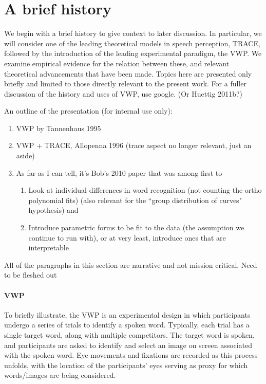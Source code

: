 \documentclass{article}
\begin{document}


\section{A brief history}
We begin with a brief history to give context to later discussion. In particular, we will consider one of the leading theoretical models in speech perception, TRACE, followed by the introduction of the leading experimental paradigm, the VWP. We examine empirical evidence for the relation between these, and relevant theoretical advancements that have been made. Topics here are presented only briefly and limited to those directly relevant to the present work. For a fuller discussion of the history and uses of VWP, use google. (Or Huettig 2011b?)

An outline of the presentation (for internal use only):

\begin{singlespace}
\begin{enumerate}
\vspace{-2mm}
\item VWP by Tannenhaus 1995
\item VWP + TRACE, Allopenna 1996 (trace aspect no longer relevant, just an aside)
\item As far as I can tell, it's Bob's 2010 paper that was among first to 
\begin{enumerate}
\item Look at individual differences in word recognition (not counting the ortho polynomial fits) (also relevant for the ``group distribution of curves" hypothesis) and
\item Introduce parametric forms to be fit to the data (the assumption we continue to run with), or at very least, introduce ones that are interpretable
\end{enumerate}
\end{enumerate}
\end{singlespace}

All of the paragraphs in this section are narrative and not mission critical. Need to be fleshed out


\paragraph{VWP} To briefly illustrate, the VWP is an experimental design in which participants undergo a series of trials to identify a spoken word. Typically, each trial has a single target word, along with multiple competitors. The target word is spoken, and participants are asked to identify and select an image on screen associated with the spoken word. Eye movements and fixations are recorded as this process unfolds, with the location of the participants' eyes serving as proxy for which words/images are being considered. 
\end{document}
